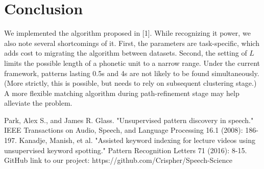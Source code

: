 \documentclass{article}
\begin{document}
\section{Conclusion}
    We implemented the algorithm proposed in [1]. While recognizing it power, we also note several 
    shortcomings of it. First, the parameters are task-specific, which adds cost to migrating the algorithm 
    between datasets. Second, the setting of $L$ limits the possible length of a phonetic unit to 
    a narrow range. Under the current framework, patterns lasting 0.5s and 4s are not likely to be found simultaneously.
    (More strictly, this is possible, but needs to rely on subsequent clustering stage.) A more flexible 
    matching algorithm during path-refinement stage may help alleviate the problem.

\begin{thebibliography}{1}
Park, Alex S., and James R. Glass. "Unsupervised pattern discovery in speech." IEEE Transactions on Audio, 
Speech, and Language Processing 16.1 (2008): 186-197.
Kanadje, Manish, et al. "Assisted keyword indexing for lecture videos using unsupervised keyword spotting." 
Pattern Recognition Letters 71 (2016): 8-15.
GitHub link to our project: https://github.com/Crispher/Speech-Science
\end{thebibliography}
\end{document}
